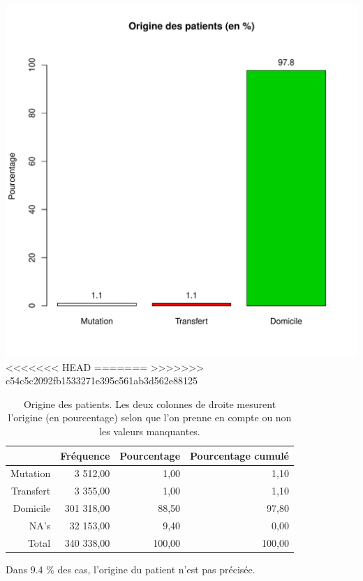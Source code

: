 \documentclass[12pt,english,french,twoside]{book}\usepackage[]{graphicx}\usepackage[]{color}
\makeatletter
\def\maxwidth{ %
  \ifdim\Gin@nat@width>\linewidth
    \linewidth
  \else
    \Gin@nat@width
  \fi
}
\makeatother
\begin{document}
\includegraphics[width=\maxwidth]{figure/mode_entree} 
<<<<<<< HEAD
=======
>>>>>>> c54c5c2092fb1533271e395c561ab3d562e88125
\begin{table}[ht]
\centering
\begin{tabular}{rrrr}
  \hline
 & Fréquence & Pourcentage & Pourcentage cumulé \\ 
  \hline
Mutation & 3 512,00 & 1,00 & 1,10 \\ 
  Transfert & 3 355,00 & 1,00 & 1,10 \\ 
  Domicile & 301 318,00 & 88,50 & 97,80 \\ 
  NA's & 32 153,00 & 9,40 & 0,00 \\ 
    Total & 340 338,00 & 100,00 & 100,00 \\ 
   \hline
\end{tabular}
\caption[Origine des patients]{Origine des patients. Les deux colonnes de droite mesurent l'origine (en pourcentage) selon que l'on prenne en compte ou non les valeurs manquantes. } 
\label{origine}
\end{table}



Dans 9.4 \% des cas, l'origine du patient n'est pas précisée.
\end{document}
